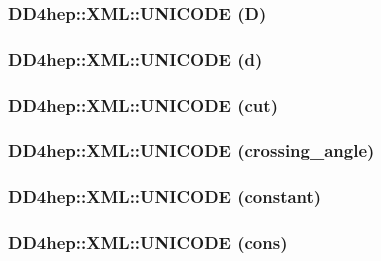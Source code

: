 \label{namespace_d_d4hep_1_1_x_m_l_a5e589c14c7bfdeb2f294317b5d4214b8}
\hypertarget{namespace_d_d4hep_1_1_x_m_l_a063d918c9f7bc329c92e5904213e7afd}{
\subsubsection[{UNICODE}]{\setlength{\rightskip}{0pt plus 5cm}DD4hep::XML::UNICODE (D)}}
\label{namespace_d_d4hep_1_1_x_m_l_a063d918c9f7bc329c92e5904213e7afd}
\hypertarget{namespace_d_d4hep_1_1_x_m_l_a5f4b54a4badf26042f974751d080bc2a}{
\subsubsection[{UNICODE}]{\setlength{\rightskip}{0pt plus 5cm}DD4hep::XML::UNICODE (d)}}
\label{namespace_d_d4hep_1_1_x_m_l_a5f4b54a4badf26042f974751d080bc2a}
\hypertarget{namespace_d_d4hep_1_1_x_m_l_a1dde75438831801262d7883f65f97435}{
\subsubsection[{UNICODE}]{\setlength{\rightskip}{0pt plus 5cm}DD4hep::XML::UNICODE (cut)}}
\label{namespace_d_d4hep_1_1_x_m_l_a1dde75438831801262d7883f65f97435}
\hypertarget{namespace_d_d4hep_1_1_x_m_l_abe108ea0fd616f2ab19be533684554f3}{
\subsubsection[{UNICODE}]{\setlength{\rightskip}{0pt plus 5cm}DD4hep::XML::UNICODE (crossing\_\-angle)}}
\label{namespace_d_d4hep_1_1_x_m_l_abe108ea0fd616f2ab19be533684554f3}
\hypertarget{namespace_d_d4hep_1_1_x_m_l_a44ae68f8355a2198dd8d202ef478b21a}{
\subsubsection[{UNICODE}]{\setlength{\rightskip}{0pt plus 5cm}DD4hep::XML::UNICODE (constant)}}
\label{namespace_d_d4hep_1_1_x_m_l_a44ae68f8355a2198dd8d202ef478b21a}
\hypertarget{namespace_d_d4hep_1_1_x_m_l_a5d361e9f15792828cd571e4f7f02c745}{
\subsubsection[{UNICODE}]{\setlength{\rightskip}{0pt plus 5cm}DD4hep::XML::UNICODE (cons)}}
